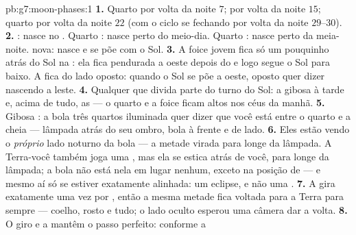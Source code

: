 \begin{solution}{pb:g7:moon-phases:1}
\textbf{1.} Quarto  por volta da noite $7$;  por
volta da noite $15$; quarto  por volta da noite $22$ (com o
ciclo se fechando por volta da noite $29$--$30$).
\textbf{2.} : nasce no . Quarto : nasce
perto do meio-dia. Quarto : nasce perto da meia-noite. 
nova: nasce e se põe com o Sol.
\textbf{3.} A foice jovem fica só um pouquinho atrás do Sol na
: ela fica pendurada a oeste depois do  e logo segue
o Sol para baixo. A  fica do lado oposto: quando o Sol se
põe a oeste, oposto quer dizer nascendo a leste.
\textbf{4.} Qualquer  que divida parte do turno do Sol: a gibosa
 à tarde e, acima de tudo, as   --- o quarto
 e a foice  ficam altos nos céus da manhã.
\textbf{5.} Gibosa : a bola três quartos iluminada quer
dizer que você está entre o quarto  e a cheia --- lâmpada
atrás do seu ombro, bola à frente e de lado.
\textbf{6.} Eles estão vendo o \emph{próprio} lado noturno da bola
--- a metade virada para longe da lâmpada. A Terra-você também joga
uma , mas ela se estica atrás de você, para longe da lâmpada; a
bola não está nela em lugar nenhum, exceto na posição de 
--- e mesmo aí só se estiver exatamente alinhada: um eclipse, e não
uma .
\textbf{7.} A  gira exatamente uma vez por , então a mesma
metade fica voltada para a Terra para sempre --- coelho, rosto e
tudo; o lado oculto esperou uma câmera dar a volta.
\textbf{8.} O giro e a  mantêm o passo perfeito: conforme a 

\end{solution}
